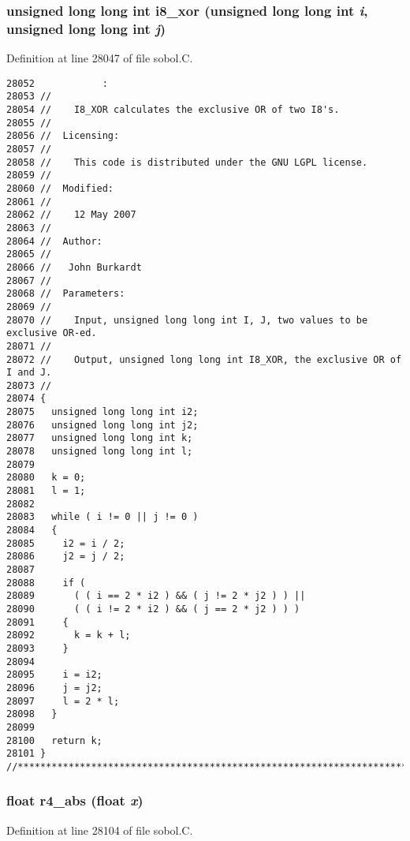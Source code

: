 \subsubsection{\setlength{\rightskip}{0pt plus 5cm}unsigned long long int i8\_\-xor (unsigned long long int {\em i}, unsigned long long int {\em j})}\label{sobol_8C_fdd081f172ecb01ebb6ab7dbdb23be95}




Definition at line 28047 of file sobol.C.

\begin{Code}\begin{verbatim}28052            :
28053 //
28054 //    I8_XOR calculates the exclusive OR of two I8's.
28055 //
28056 //  Licensing:
28057 //
28058 //    This code is distributed under the GNU LGPL license. 
28059 //
28060 //  Modified:
28061 //
28062 //    12 May 2007
28063 //
28064 //  Author:
28065 //
28066 //   John Burkardt
28067 //
28068 //  Parameters:
28069 //
28070 //    Input, unsigned long long int I, J, two values to be exclusive OR-ed.
28071 //
28072 //    Output, unsigned long long int I8_XOR, the exclusive OR of I and J.
28073 //
28074 {
28075   unsigned long long int i2;
28076   unsigned long long int j2;
28077   unsigned long long int k;
28078   unsigned long long int l;
28079 
28080   k = 0;
28081   l = 1;
28082 
28083   while ( i != 0 || j != 0 )
28084   {
28085     i2 = i / 2;
28086     j2 = j / 2;
28087 
28088     if ( 
28089       ( ( i == 2 * i2 ) && ( j != 2 * j2 ) ) ||
28090       ( ( i != 2 * i2 ) && ( j == 2 * j2 ) ) )
28091     {
28092       k = k + l;
28093     }
28094 
28095     i = i2;
28096     j = j2;
28097     l = 2 * l;
28098   }
28099 
28100   return k;
28101 }
//****************************************************************************80
\end{verbatim}
\end{Code}


\subsubsection{\setlength{\rightskip}{0pt plus 5cm}float r4\_\-abs (float {\em x})}\label{sobol_8C_5c1bb00b7d83fa1723180a27a5d252e8}




Definition at line 28104 of file sobol.C.


